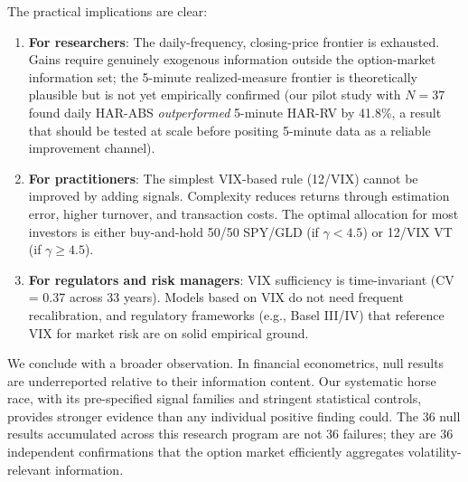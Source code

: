 \documentclass[12pt,a4paper]{article}
\begin{document}
The practical implications are clear:

\begin{enumerate}
    \item \textbf{For researchers}: The daily-frequency, closing-price frontier is exhausted. Gains require genuinely exogenous information outside the option-market information set; the 5-minute realized-measure frontier is theoretically plausible but is not yet empirically confirmed (our pilot study with $N = 37$ found daily HAR-ABS \emph{outperformed} 5-minute HAR-RV by 41.8\%, a result that should be tested at scale before positing 5-minute data as a reliable improvement channel).

    \item \textbf{For practitioners}: The simplest VIX-based rule (12/VIX) cannot be improved by adding signals. Complexity reduces returns through estimation error, higher turnover, and transaction costs. The optimal allocation for most investors is either buy-and-hold 50/50 SPY/GLD (if $\gamma < 4.5$) or 12/VIX VT (if $\gamma \geq 4.5$).

    \item \textbf{For regulators and risk managers}: VIX sufficiency is time-invariant (CV = 0.37 across 33 years). Models based on VIX do not need frequent recalibration, and regulatory frameworks (e.g., Basel III/IV) that reference VIX for market risk are on solid empirical ground.
\end{enumerate}

We conclude with a broader observation. In financial econometrics, null results are underreported relative to their information content. Our systematic horse race, with its pre-specified signal families and stringent statistical controls, provides stronger evidence than any individual positive finding could. The 36 null results accumulated across this research program are not 36 failures; they are 36 independent confirmations that the option market efficiently aggregates volatility-relevant information.


\end{document}
